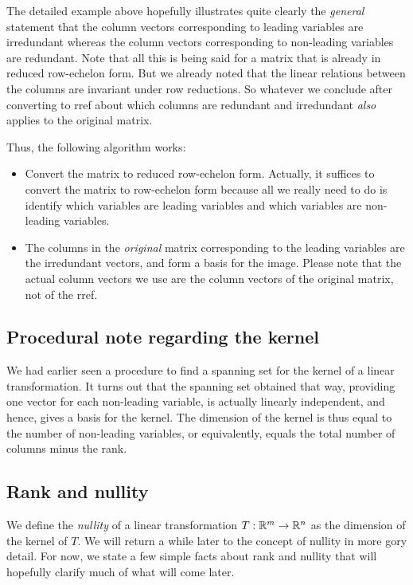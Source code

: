 \documentclass[10pt]{amsart}
\begin{document}
The detailed example above hopefully illustrates quite clearly the
{\em general} statement that the column vectors corresponding to
leading variables are irredundant whereas the column vectors
corresponding to non-leading variables are redundant. Note that all
this is being said for a matrix that is already in reduced row-echelon
form. But we already noted that the linear relations between the
columns are invariant under row reductions. So whatever we conclude
after converting to rref about which columns are redundant and
irredundant {\em also} applies to the original matrix.

Thus, the following algorithm works:

\begin{itemize}
\item Convert the matrix to reduced row-echelon form. Actually, it
  suffices to convert the matrix to row-echelon form because all we
  really need to do is identify which variables are leading variables
  and which variables are non-leading variables.
\item The columns in the {\em original} matrix corresponding to the
  leading variables are the irredundant vectors, and form a basis for
  the image. Please note that the actual column vectors we use are the
  column vectors of the original matrix, not of the rref.
\end{itemize}



\subsection{Procedural note regarding the kernel}

We had earlier seen a procedure to find a spanning set for the kernel
of a linear transformation. It turns out that the spanning set
obtained that way, providing one vector for each non-leading variable,
is actually linearly independent, and hence, gives a basis for the
kernel. The dimension of the kernel is thus equal to the number of
non-leading variables, or equivalently, equals the total number of
columns minus the rank.

\subsection{Rank and nullity}

We define the {\em nullity} of a linear transformation $T:\mathbb{R}^m \to
\mathbb{R}^n$ as the dimension of the kernel of $T$. We will return a while
later to the concept of nullity in more gory detail. For now, we state
a few simple facts about rank and nullity that will hopefully clarify
much of what will come later.
\end{document}
